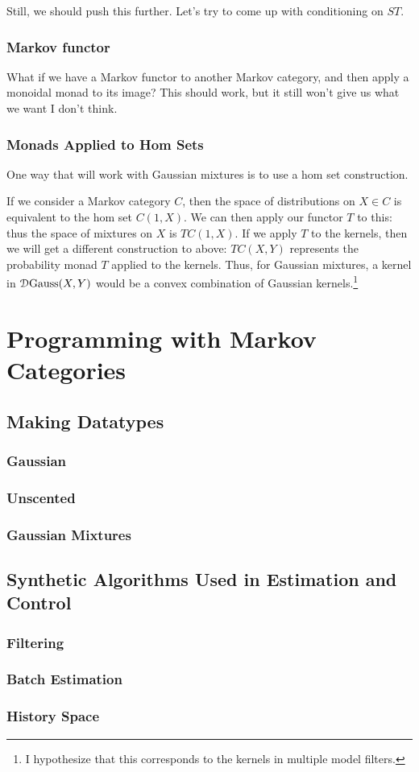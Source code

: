 Still, we should push this further. Let's try to come up with conditioning on $ST$.

\subsection{Markov functor}

What if we have a Markov functor to another Markov category, and then apply a monoidal monad to its image?
This should work, but it still won't give us what we want I don't think.

\subsection{Monads Applied to Hom Sets}

One way that will work with Gaussian mixtures is to use a hom set construction.

If we consider a Markov category $C$, then the space of distributions on $X\in C$ is equivalent to the hom set $C(1,X)$.
We can then apply our functor $T$ to this: thus the space of mixtures on $X$ is $TC(1,X)$.
If we apply $T$ to the kernels, then we will get a different construction to above: $TC(X,Y)$ represents the probability monad $T$ applied to the kernels.
Thus, for Gaussian mixtures, a kernel in $\mathcal{D} \mathrm{Gauss}(X,Y)$ would be a convex combination of Gaussian kernels.\footnote{I hypothesize that this corresponds to the kernels in multiple model filters.}



\chapter{Programming with Markov Categories}
\section{Making Datatypes}
\subsection{Gaussian}
\subsection{Unscented}
\subsection{Gaussian Mixtures}


\section{Synthetic Algorithms Used in Estimation and Control}
\subsection{Filtering}
\subsection{Batch Estimation}
\subsection{History Space}
